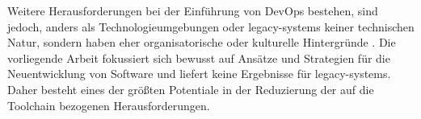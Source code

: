 Weitere Herausforderungen bei der Einführung von DevOps bestehen, sind jedoch, anders als Technologieumgebungen oder \Glspl{legacy-system} keiner technischen Natur, sondern haben eher organisatorische oder kulturelle Hintergründe \cite{001:DevOps-Adoption-in-Software-Development}. Die vorliegende Arbeit fokussiert sich bewusst auf Ansätze und Strategien für die Neuentwicklung von Software und liefert keine Ergebnisse für \Glspl{legacy-system}. Daher besteht eines der größten Potentiale in der Reduzierung der auf die Toolchain bezogenen Herausforderungen.
